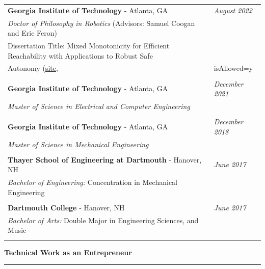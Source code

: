 \documentclass{article}
\begin{document}
\begin{tabular}{ m{6in} m{1in}}
\textbf{Georgia Institute of Technology} - Atlanta, GA & \textit{August 2022} \\
\textit{Doctor of Philosophy in Robotics} (Advisors: Samuel Coogan and Eric Feron) & \\
    Dissertation Title: Mixed Monotonicity for Efficient Reachability with Applications to Robust Safe \\
        Autonomy (\href{https://repository.gatech.edu/entities/publication/d65ceea6-97ce-413f-ac6e-e0837dd1fa96}{site}, \href{https://smartech.gatech.edu/bitstream/handle/1853/67309/ABATE-DISSERTATION-2022.pdf?sequence=1&isAllowed=y}{pdf}) &\\ \\
\textbf{Georgia Institute of Technology} - Atlanta, GA & \textit{December 2021} \\
\textit{Master of Science in Electrical and Computer Engineering}  
& \\  \\
\textbf{Georgia Institute of Technology} - Atlanta, GA & \textit{December 2018} \\
\textit{Master of Science in Mechanical Engineering}  & \\
    \\
 \textbf{Thayer School of Engineering at Dartmouth} - Hanover, NH & \textit{June 2017} \\
    \textit{Bachelor of Engineering:} Concentration in Mechanical Engineering  &  \\ \\
 \textbf{Dartmouth College} - Hanover, NH & \textit{June 2017} \\
    \textit{Bachelor of Arts:} Double Major in Engineering Sciences, and Music  & 
    \\ \\
\end{tabular}
\medskip
\medskip

\noindent\:\:\textbf{\large{Technical Work as an Entrepreneur}}
\vspace{.1cm}
\hrule
\vspace{.2cm}
\end{document}
